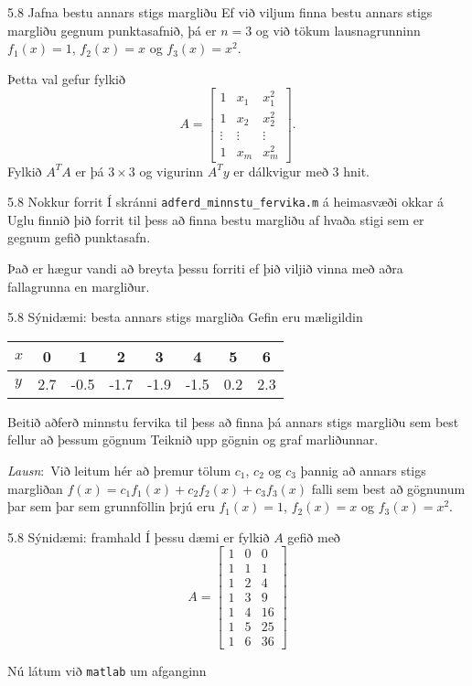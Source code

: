 \begin{frame}{5.8 Jafna bestu annars stigs margliðu}
Ef við viljum finna bestu annars stigs margliðu gegnum punktasafnið,
þá er  
$n=3$ og við tökum lausnagrunninn $f_1(x)=1$, $f_2(x)=x$  og 
$f_3(x)=x^2$.  

\pause
\smallskip
Þetta val gefur fylkið
\begin{equation*}
	A = \left[\begin{matrix} 
		1& x_1 & x_1^2\\
		1& x_2 & x_2^2\\
		\vdots &\vdots &\vdots\\
		1& x_m& x_m^2 
	\end{matrix}\right].
\end{equation*}
Fylkið $A^TA$ er þá $3\times 3$ og vigurinn $A^Ty$ er dálkvigur með
$3$ hnit.  
\end{frame}

\begin{frame}{5.8 Nokkur forrit} 
Í skránni {\tt adferd\_minnstu\_fervika.m}
á heimasvæði okkar á Uglu finnið þið forrit til þess að finna bestu
margliðu af hvaða stigi sem er gegnum gefið punktasafn.   

\pause
\smallskip
Það er hægur vandi að breyta þessu forriti ef þið viljið vinna með
aðra fallagrunna en margliður.
\end{frame}

\begin{frame}{5.8 Sýnidæmi:   besta annars stigs margliða} 
Gefin eru mæligildin 

\begin{center}
\begin{tabular}{l|ccccccc}
$x$ & 0& 1 & 2 & 3 & 4 & 5 & 6\\ \hline
$y$ & 2.7 & -0.5  & -1.7 &-1.9 & -1.5 & 0.2 &2.3 
\end{tabular}
\end{center}
Beitið aðferð minnstu fervika til þess að finna 
þá annars stigs margliðu sem best fellur að þessum gögnum
Teiknið upp gögnin og graf marliðunnar.

\pause
\bigskip
{\it Lausn}:\  Við leitum hér að þremur tölum $c_1$, $c_2$ og 
$c_3$ þannig að annars stigs margliðan
$f(x)=c_1f_1(x)+c_2f_2(x)+c_3f_3(x)$  falli sem best að gögnunum
þar sem þar sem grunnföllin þrjú eru
$f_1(x)=1$, $f_2(x)=x$ og $f_3(x)=x^2$.
\end{frame}

\begin{frame}{5.8 Sýnidæmi: framhald}
Í þessu dæmi er fylkið $A$ gefið með
$$
A=\left[\begin{matrix}
1 & 0&0\\
1 & 1&1\\
1&2&4\\
1&3&9\\
1&4&16\\
1&5&25\\
1&6&36
\end{matrix}\right]
$$

Nú látum við {\tt matlab} um afganginn
\end{frame}

